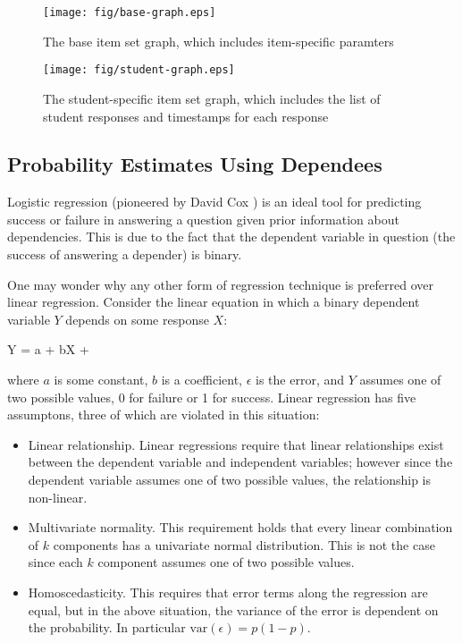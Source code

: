 \begin{figure}[!p]
\label{fig:base-graph}
  \centering\texttt{[image: fig/base-graph.eps]}
\caption{The base item set graph, which includes item-specific paramters}
\end{figure}

\begin{figure}[!p]
\label{fig:student-graph}
  \centering\texttt{[image: fig/student-graph.eps]}
\caption{The student-specific item set graph, which includes the list of
student responses and timestamps for each response}
\end{figure}

\subsection{Probability Estimates Using Dependees}

Logistic regression (pioneered by David Cox \cite{cox:1958}) is an ideal tool
for predicting success or failure in answering a question given prior
information about dependencies.  This is due to the fact that the dependent
variable in question (the success of answering a depender) is binary.  

One may wonder why any other form of regression technique is preferred over
linear regression.  Consider the linear equation in which a binary dependent
variable $Y$ depends on some response $X$:

\begin{equations}
         Y = a + bX + \epsilon
\end{equations}

where $a$ is some constant, $b$ is a coefficient, $\epsilon$ is the error, and
$Y$ assumes one of two possible values, 0 for failure or 1 for success.  Linear
regression has five assumptons, three of which are violated in this situation:


\begin{itemize}

  \item Linear relationship. Linear regressions require that linear
  relationships exist between the dependent variable and independent variables;
  however since the dependent variable assumes one of two possible values, the
  relationship is non-linear.

  \item Multivariate normality. This requirement holds that every linear
  combination of $k$ components has a univariate normal distribution.  This
  is not the case since each $k$ component assumes one of two possible values.

  \item Homoscedasticity. This requires that error terms along the regression
  are equal, but in the above situation, the variance of the error is dependent
  on the probability.   In particular $\mathrm{var}(\epsilon) = p(1-p)$.

\end{itemize} 

